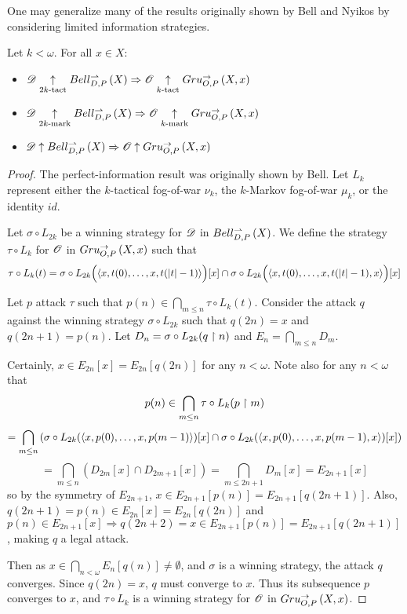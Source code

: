 One may generalize many of the results originally shown by Bell \cite{MR3239205}
and Nyikos \cite{nyikosProximalPreprint} by considering limited information
strategies.

\begin{thm}
Let $k<\omega$. For all $x\in X$:
  \begin{itemize}
    \item
      $
        \mathscr{D}\underset{2k\text{-tact}}{\uparrow} Bell_{D,P}^{\rightharpoonup}\left({X}\right)
          \Rightarrow
        \mathscr{O} \underset{k\text{-tact}}{\uparrow} Gru_{O,P}^{\to}\left({X},{x}\right)
      $
    \item
      $
        \mathscr{D}\underset{2k\text{-mark}}{\uparrow} Bell_{D,P}^{\rightharpoonup}\left({X}\right)
          \Rightarrow
        \mathscr{O} \underset{k\text{-mark}}{\uparrow} Gru_{O,P}^{\to}\left({X},{x}\right)
      $
    \item
      $
        \mathscr{D}\uparrow Bell_{D,P}^{\rightharpoonup}\left({X}\right)
          \Rightarrow
        \mathscr{O} \uparrow Gru_{O,P}^{\to}\left({X},{x}\right)
      $
  \end{itemize}
\end{thm}

\begin{proof}
The perfect-information result was originally shown by Bell.
Let $L_k$ represent either the $k$-tactical fog-of-war $\nu_k$,
the $k$-Markov fog-of-war $\mu_k$, or the identity $id$.

Let $\sigma\circ L_{2k}$ be a winning strategy for $\mathscr{D}$ in $Bell_{D,P}^{\rightharpoonup}\left({X}\right)$.
We define the strategy $\tau\circ L_k$ for $\mathscr{O}$ in $Gru_{O,P}^{\to}\left({X},{x}\right)$ such
that
  \[
    \tau\circ {L}_k(t)
      =
    \sigma\circ {L}_{2k} \Big(\langle x,t(0),\dots,x,t(|t|-1)\rangle\Big)[x]
      \cap
    \sigma\circ {L}_{2k} \Big(\langle x,t(0),\dots,x,t(|t|-1),x\rangle\Big)[x]
  \]

Let $p$ attack $\tau$ such that $p(n)\in\bigcap_{m\leq n}\tau\circ L_k(t)$.
Consider the attack $q$ against the winning strategy
$\sigma\circ {L}_{2k}$ such that $q(2n)=x$ and $q(2n+1)=p(n)$.
Let $D_n=\sigma\circ {L}_{2k}(q\restriction n)$ and $E_n=\bigcap_{m\leq n}D_m$.

Certainly, $x\in E_{2n}[x]= E_{2n}[q(2n)]$ for any $n<\omega$.
Note also for any $n<\omega$ that
    \[
      p(n) \in
      \bigcap_{m\leq n}\tau\circ {L}_k(p\restriction m)
    \]
    \[
      =
      \bigcap_{m\leq n}\left(
        \sigma\circ {L}_{2k}(\langle x,p(0),\dots,x,p(m-1)\rangle)[x]\cap
        \sigma\circ {L}_{2k}(\langle x,p(0),\dots,x,p(m-1),x\rangle)[x]
      \right)
    \]
    \[
      =
      \bigcap_{m\leq n}\left(
        D_{2m}[x]\cap
        D_{2m+1}[x]
      \right) =
      \bigcap_{m\leq 2n+1} D_m[x]=E_{2n+1}[x]
    \]
so by the symmetry of $E_{2n+1}$, $x\in E_{2n+1}[p(n)]= E_{2n+1}[q(2n+1)]$.
Also, $q(2n+1)=p(n)\in E_{2n}[x]=E_{2n}[q(2n)]$ and
$p(n)\in E_{2n+1}[x] \Rightarrow q(2n+2)=x\in E_{2n+1}[p(n)]=E_{2n+1}[q(2n+1)]$,
making $q$ a legal attack.

Then as $x\in \bigcap_{n<\omega} E_n[q(n)]\not=\emptyset$, and $\sigma$ is
a winning strategy, the attack $q$ converges. Since $q(2n)=x$, $q$ must
converge to $x$. Thus its subsequence $p$ converges to $x$, and $\tau\circ L_k$
is a winning strategy for $\mathscr{O}$ in $Gru_{O,P}^{\to}\left({X},{x}\right)$.
\end{proof}

